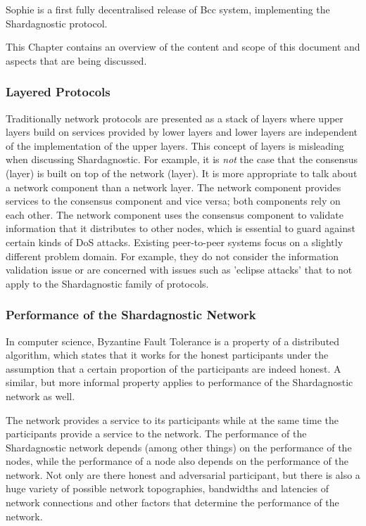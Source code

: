 Sophie is a first fully decentralised release of Bcc system, implementing the Shardagnostic protocol.

This Chapter contains an overview of the content and scope of this document and aspects that
are being discussed.


\subsubsection{Layered Protocols}
Traditionally network protocols are presented as a stack of layers where
upper layers build on services provided by lower layers and lower layers
are independent of the implementation of the upper layers.
This concept of layers is misleading when discussing Shardagnostic.
For example, it is {\em not} the case that the consensus (layer)
is built on top of the network (layer).
It is more appropriate to talk about a network component than a network layer.
The network component provides services to the consensus component and vice versa;
both components rely on each other.
The network component uses the consensus component to validate
information that it distributes to other nodes, which
is essential to guard against certain kinds of DoS attacks.
Existing peer-to-peer systems focus on a slightly different problem domain.
For example, they do not consider the information validation issue
or are concerned with issues such as 'eclipse attacks' that to not
apply to the Shardagnostic family of protocols.


\subsubsection{Performance of the Shardagnostic Network}
In computer science, Byzantine Fault Tolerance is a property of a distributed algorithm, which states
that it works for the honest participants
under the assumption that a certain proportion of the participants are indeed honest.
A similar, but more informal property applies to performance of the Shardagnostic network as well.

The network provides a service to its participants while at the same
time the participants provide a service to the network.
The performance of the Shardagnostic network depends (among other things) on the performance of the nodes,
while the performance of a node also depends on the performance of the network.
Not only are there honest and adversarial participant, but there is also a huge variety of
possible network topographies, bandwidths and latencies of network connections and other
factors that determine the performance of the network.

